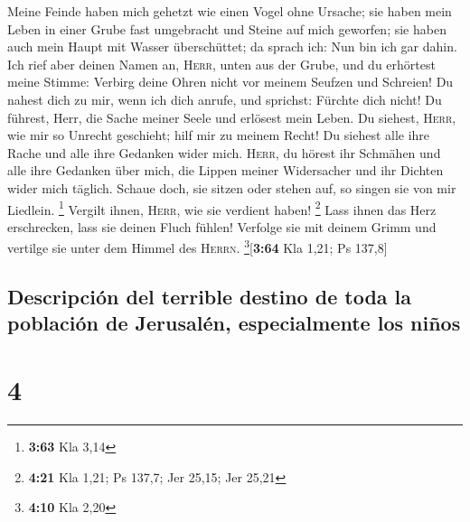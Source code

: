  Meine Feinde haben mich gehetzt wie einen Vogel ohne
Ursache;  sie haben mein Leben in einer Grube fast
umgebracht und Steine auf mich geworfen;  sie haben auch
mein Haupt mit Wasser überschüttet; da sprach ich: Nun bin ich gar
dahin.  Ich rief aber deinen Namen an, \textsc{Herr},
unten aus der Grube,  und du erhörtest meine Stimme:
Verbirg deine Ohren nicht vor meinem Seufzen und Schreien!
 Du nahest dich zu mir, wenn ich dich anrufe, und
sprichst: Fürchte dich nicht!  Du führest, Herr, die
Sache meiner Seele und erlösest mein Leben.  Du siehest,
\textsc{Herr}, wie mir so Unrecht geschieht; hilf mir zu meinem Recht!
 Du siehest alle ihre Rache und alle ihre Gedanken wider
mich.  \textsc{Herr}, du hörest ihr Schmähen und alle
ihre Gedanken über mich,  die Lippen meiner Widersacher
und ihr Dichten wider mich täglich.  Schaue doch, sie
sitzen oder stehen auf, so singen sie von mir Liedlein. \footnote{\textbf{3:63}
  Kla 3,14}  Vergilt ihnen, \textsc{Herr}, wie sie
verdient haben! \footnote{\textbf{4:21} Kla 1,21; Ps 137,7; Jer 25,15;
  Jer 25,21}  Lass ihnen das Herz erschrecken, lass sie
deinen Fluch fühlen!  Verfolge sie mit deinem Grimm und
vertilge sie unter dem Himmel des \textsc{Herrn}.
\footnote{\textbf{4:10} Kla 2,20}{[}\textbf{3:64} Kla 1,21; Ps 137,8{]}

\hypertarget{descripciuxf3n-del-terrible-destino-de-toda-la-poblaciuxf3n-de-jerusaluxe9n-especialmente-los-niuxf1os}{%
\subsection{Descripción del terrible destino de toda la población de
Jerusalén, especialmente los
niños}\label{descripciuxf3n-del-terrible-destino-de-toda-la-poblaciuxf3n-de-jerusaluxe9n-especialmente-los-niuxf1os}}

\hypertarget{section-3}{%
\section{4}\label{section-3}}

